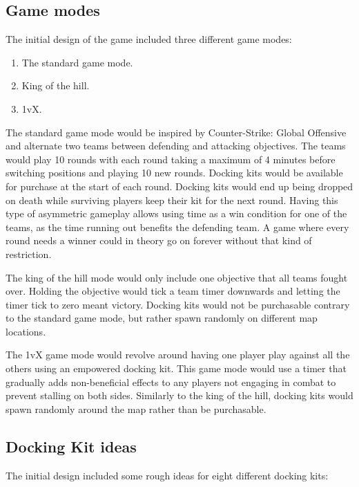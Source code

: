 \subsection{Game modes}
The initial design of the game included three different game modes: 

\begin{enumerate}
    \item The standard game mode.
    \item King of the hill.
    \item 1vX. 
\end{enumerate}

The standard game mode would be inspired by Counter-Strike: Global Offensive~\cite{csGO} and alternate two teams between defending and attacking objectives. The teams would play 10 rounds with each round taking a maximum of 4 minutes before switching positions and playing 10 new rounds. Docking kits would be available for purchase at the start of each round. Docking kits would end up being dropped on death while surviving players keep their kit for the next round. Having this type of asymmetric gameplay allows using time as a win condition for one of the teams, as the time running out benefits the defending team. A game where every round needs a winner could in theory go on forever without that kind of restriction.

The king of the hill mode would only include one objective that all teams fought over. Holding the objective would tick a team timer downwards and letting the timer tick to zero meant victory. Docking kits would not be purchasable contrary to the standard game mode, but rather spawn randomly on different map locations. 
    
The 1vX game mode would revolve around having one player play against all the others using an empowered docking kit. This game mode would use a timer that gradually adds non-beneficial effects to any players not engaging in combat to prevent stalling on both sides. Similarly to the king of the hill, docking kits would spawn randomly around the map rather than be purchasable.  

\subsection{Docking Kit ideas}
The initial design included some rough ideas for eight different docking kits:

